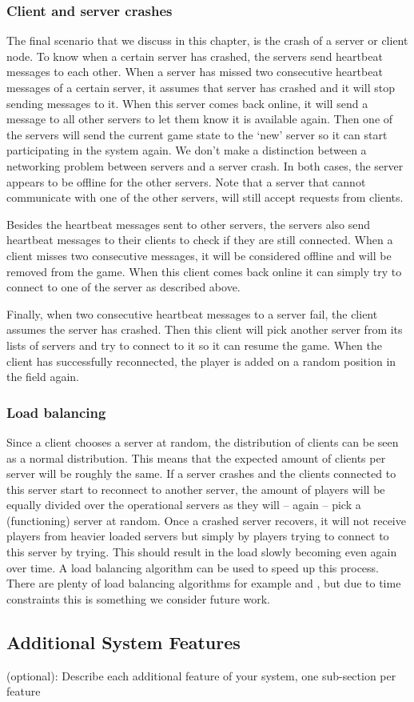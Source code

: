 \subsubsection{Client and server crashes}
\label{subsubsec:client_server_crashes}
The final scenario that we discuss in this chapter, is the crash of a server or client node. 
To know when a certain server has crashed, the servers send heartbeat messages to each other. 
When a server has missed two consecutive heartbeat messages of a certain server, it assumes that server has crashed and it will stop sending messages to it.
When this server comes back online, it will send a message to all other servers to let them know it is available again. 
Then one of the servers will send the current game state to the `new' server so it can start participating in the system again.
We don't make a distinction between a networking problem between servers and a server crash. 
In both cases, the server appears to be offline for the other servers. 
Note that a server that cannot communicate with one of the other servers, will still accept requests from clients.

Besides the heartbeat messages sent to other servers, the servers also send heartbeat messages to their clients to check if they are still connected. 
When a client misses two consecutive messages, it will be considered offline and will be removed from the game.
When this client comes back online it can simply try to connect to one of the server as described above.

Finally, when two consecutive heartbeat messages to a server fail, the client assumes the server has crashed. 
Then this client will pick another server from its lists of servers and try to connect to it so it can resume the game. 
When the client has successfully reconnected, the player is added on a random position in the field again.

\subsubsection{Load balancing}
\label{subsubsec:load_balancing}
	Since a client chooses a server at random, the distribution of clients can be seen as a normal distribution. 
	This means that the expected amount of clients per server will be roughly the same.
	If a server crashes and the clients connected to this server start to reconnect to another server, the amount of players will be equally divided over the operational servers as they will -- again -- pick a (functioning) server at random.
	Once a crashed server recovers, it will not receive players from heavier loaded servers but simply by players trying to connect to this server by trying. 
	This should result in the load slowly becoming even again over time. 
	A load balancing algorithm can be used to speed up this process.
	There are plenty of load balancing algorithms for example \cite{wolff2001dynamic} and \cite{ballard2000client}, but due to time constraints this is something we consider future work.

\subsection{Additional System Features}
\label{subsec:additional_features}
(optional): Describe each additional feature of your system, one sub-section per feature
 
